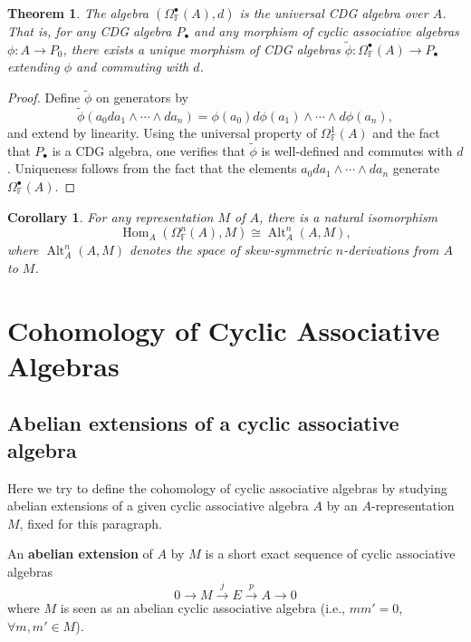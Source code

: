\documentclass[pdflatex,sn-mathphys-num]{sn-jnl}%
\theoremstyle{thmstyleone}%
\newtheorem{theorem}{Theorem}%
\newtheorem{corollary}{Corollary}[section]
\theoremstyle{thmstyletwo}%
\theoremstyle{thmstylethree}%
\begin{document}
\begin{theorem}\label{thm:universal_cdg}
The algebra $(\Omega^\bullet_{\mathbb{F}}(A), d)$ is the universal CDG algebra over $A$. That is, for any CDG algebra $P_\bullet$ and any morphism of cyclic associative algebras $\phi: A \to P_0$, there exists a unique morphism of CDG algebras $\widetilde{\phi}: \Omega^\bullet_{\mathbb{F}}(A) \to P_\bullet$ extending $\phi$ and commuting with $d$.
\end{theorem}

\begin{proof}
Define $\widetilde{\phi}$ on generators by
\[
\widetilde{\phi}(a_0 da_1 \wedge \cdots \wedge da_n) = \phi(a_0) d\phi(a_1) \wedge \cdots \wedge d\phi(a_n),
\]
and extend by linearity. Using the universal property of $\Omega^1_{\mathbb{F}}(A)$ and the fact that $P_\bullet$ is a CDG algebra, one verifies that $\widetilde{\phi}$ is well-defined and commutes with $d$. Uniqueness follows from the fact that the elements $a_0 da_1 \wedge \cdots \wedge da_n$ generate $\Omega^\bullet_{\mathbb{F}}(A)$. 
\end{proof}

\begin{corollary}\label{cor:derivative_representation}
For any representation $M$ of $A$, there is a natural isomorphism
\[
\operatorname{Hom}_A(\Omega^n_{\mathbb{F}}(A), M) \cong \operatorname{Alt}^n_A(A, M),
\]
where $\operatorname{Alt}^n_A(A, M)$ denotes the space of skew-symmetric $n$-derivations from $A$ to $M$.
\end{corollary}
\section{Cohomology of Cyclic Associative Algebras}

\subsection{Abelian extensions of a cyclic associative algebra}

Here we try to define the cohomology of cyclic associative algebras by studying abelian extensions of a given cyclic associative algebra $A$ by an $A$-representation $M$, fixed for this paragraph.

An \textbf{abelian extension} of $A$ by $M$ is a short exact sequence of cyclic associative algebras
\[
0 \longrightarrow M \xrightarrow{j} E \xrightarrow{p} A \longrightarrow 0
\]
where $M$ is seen as an abelian cyclic associative algebra (i.e., $mm' = 0$, $\forall m, m' \in M$).
\end{document}
